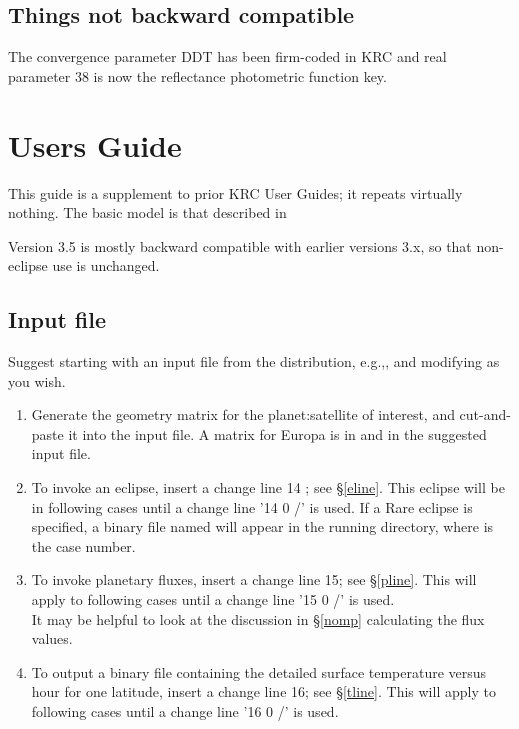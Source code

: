 \documentclass{article}
\begin{document}
\subsection{Things not backward compatible}
 The convergence parameter DDT has been firm-coded in KRC and real parameter 38 is now the reflectance photometric function key.   

\section{Users Guide}

This guide is a supplement to prior KRC User Guides; it repeats virtually
nothing. The basic model is that described in 

Version 3.5 is mostly backward compatible with earlier versions 3.x, so that
non-eclipse use is unchanged. 
\subsection{Input file}
Suggest starting with an input file from the distribution, e.g.,,
and modifying as you wish.

\begin{enumerate}    %
\item Generate the geometry matrix for the planet:satellite of interest, and
  cut-and-paste it into the input file. A matrix for Europa is in
   and in the suggested input file.

\item To invoke an eclipse, insert a change line 14 ; see \S \ref{eline}. This
  eclipse will be in following cases until a change line '14 0 /' is used.  If a
  Rare eclipse is specified, a binary file named  will appear
  in the running directory, where  is the case number.

\item To invoke planetary fluxes, insert a change line 15; see \S \ref{pline}.
  This will apply to following cases until a change line '15 0 /' is used.
  \\ It may be helpful to look at the discussion in \S \ref{nomp} calculating
  the flux values.

\item To output a binary file containing the detailed surface temperature versus
  hour for one latitude, insert a change line 16; see \S \ref{tline}. This will
  apply to following cases until a change line '16 0 /' is used.

\end{enumerate}
\end{document}
